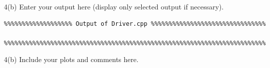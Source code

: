 \documentclass[a4,10pt,fleqn]{article}  %
\begin{document}
\vspace{\baselineskip}
\begin{enumerate}

\item[4(b)] Enter your output here (display only selected output if necessary).

\begin{verbatim}
%%%%%%%%%%%%%%%%%%% Output of Driver.cpp %%%%%%%%%%%%%%%%%%%%%%%%%%%%%%%%

%%%%%%%%%%%%%%%%%%%%%%%%%%%%%%%%%%%%%%%%%%%%%%%%%%%%%%%%%%%%%%%%%%%%%%%%%
\end{verbatim}

\item[4(b)] Include your plots and comments here.


\end{enumerate}
\end{document}
